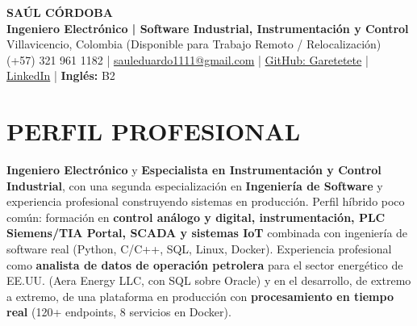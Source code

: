 \documentclass[letterpaper,10pt]{article}
\begin{document}
\begin{center}
    {\Huge \bfseries SAÚL CÓRDOBA} \\[3pt]
    {\Large \textbf{Ingeniero Electrónico | Software Industrial, Instrumentación y Control}} \\[2pt]
    Villavicencio, Colombia (Disponible para Trabajo Remoto / Relocalización) \\
    (+57) 321 961 1182 | \href{mailto:sauleduardo1111@gmail.com}{sauleduardo1111@gmail.com} | \href{https://github.com/Garetetete}{GitHub: Garetetete} | \href{https://www.linkedin.com/in/saul-cordoba-a2997427b}{LinkedIn} | \textbf{Inglés:} B2
\end{center}

\section{PERFIL PROFESIONAL}
\textbf{Ingeniero Electrónico} y \textbf{Especialista en Instrumentación y Control Industrial}, con una segunda especialización en \textbf{Ingeniería de Software} y experiencia profesional construyendo sistemas en producción. Perfil híbrido poco común: formación en \textbf{control análogo y digital, instrumentación, PLC Siemens/TIA Portal, SCADA y sistemas IoT} combinada con ingeniería de software real (Python, C/C++, SQL, Linux, Docker). Experiencia profesional como \textbf{analista de datos de operación petrolera} para el sector energético de EE.UU. (Aera Energy LLC, con SQL sobre Oracle) y en el desarrollo, de extremo a extremo, de una plataforma en producción con \textbf{procesamiento en tiempo real} (120+ endpoints, 8 servicios en Docker).

\end{document}
